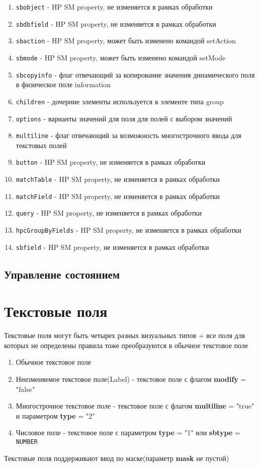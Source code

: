 \documentclass[../index.tex]{subfiles}
\begin{document}
\begin{enumerate}
	\item \verb|sbobject| - HP SM property, не изменяется в рамках обработки
	\item \verb|sbdbfield| - HP SM property, не изменяется в рамках обработки
	\item \verb|sbaction| - HP SM property, может быть изменено командой setAction
	\item \verb|sbmode| - HP SM property, может быть изменено командой setMode
	\item \verb|sbcopyinfo| - флаг отвечающий за копирование значения динамического поля в физическое поле information 
	\item \verb|children| - дочерние элементы используется в элементе типа group
	\item \verb|options| - варианты значений для поля для полей с выбором значений
	\item \verb|multiline| - флаг отвечающий за возможность многострочного ввода для текстовых полей
	\item \verb|button| - HP SM property, не изменяется в рамках обработки
	\item \verb|matchTable| - HP SM property, не изменяется в рамках обработки
	\item \verb|matchField| - HP SM property, не изменяется в рамках обработки
	\item \verb|query| - HP SM property, не изменяется в рамках обработки
	\item \verb|hpcGroupByFields| - HP SM property, не изменяется в рамках обработки
	\item \verb|sbfield| - HP SM property, не изменяется в рамках обработки
\end{enumerate}

\subsection{Управление состоянием}

\section{Текстовые поля}
	Текстовые поля могут быть четырех разных визуальных типов + все поля для которых не определены правила тоже преобразуются в обычное текстовое поле
	\begin{enumerate}
		\item Обычное текстовое поле
		\item Неизменяемое текстовое поле(Label) - текстовое поле с флагом \textbf{modify} = "false"
		\item Многострочное текстовое поле - текстовое поле с флагом \textbf{multiline} = "true" и параметром \textbf{type} = "2"
		\item Числовое поле - текстовое поле с параметром \textbf{type} = "1" или \textbf{sbtype} = \verb|NUMBER|
	\end{enumerate}
	Текстовые поля поддерживают ввод по маске(параметр \textbf{mask} не пустой)
\end{document}
